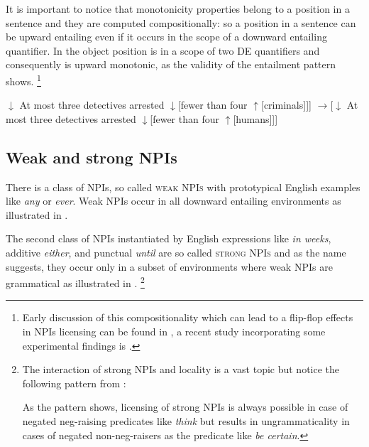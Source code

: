 \documentclass[output=paper,
]{langscibook}
\begin{document}
\noindent It is important to notice that monotonicity properties belong to a position in a sentence and they are computed compositionally: so a position in a sentence can be upward entailing even if it occurs in the scope of a downward entailing quantifier. In  the object position is in a scope of two DE quantifiers and consequently is upward monotonic, as the validity of the entailment pattern shows.%
\footnote{Early discussion of this compositionality which can lead to a flip-flop effects in NPIs licensing can be found in \citet{baker1970double}, a recent study incorporating some experimental findings is \citet{geurts2005monotonicity}.}

\ea\label{ex-16} \ea {[}$\downarrow$ At most three detectives arrested
$\downarrow${[}fewer than four $\uparrow${[}criminals{]}{]}{]}
\ex $\rightarrow${[}$\downarrow$ At most three detectives arrested $\downarrow${[}fewer than four $\uparrow${[}humans{]}{]}{]}
\z
\z

\subsection{Weak and strong NPIs}\label{weak-npis}

\noindent There is a class of NPIs, so called \textsc{weak NPIs} with prototypical English examples like  \textit{any} or \textit{ever}. Weak NPIs occur in all downward entailing environments as illustrated in .

\ea\label{ex-17} 
\z
\z

\noindent The second class of NPIs instantiated by English expressions like  \textit{in weeks}, additive \textit{either}, and punctual \textit{until} are so called \textsc{strong NPIs} and as the name suggests, they occur only in a subset of environments where weak NPIs are grammatical as illustrated in .%
\footnote{The interaction of strong NPIs and locality is a vast topic but notice the following pattern from \citet[317]{romoli2013scalar}:

\ea {}
\z
\z

\noindent As the pattern shows, licensing of strong NPIs is always possible in case of negated neg-raising predicates like \textit{think} but results in ungrammaticality in cases of negated non-neg-raisers as the predicate like \textit{be certain}.
}
\end{document}
